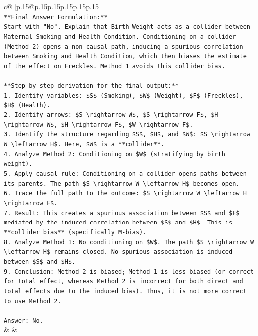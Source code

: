 \documentclass{article}
\begin{document}
{\begin{supertabular}{c@{$\;$}|p{.15\linewidth}@{}p{.15\linewidth}p{.15\linewidth}p{.15\linewidth}p{.15\linewidth}p{.15\linewidth}}
{{{\\ 
\texttt{**Final Answer Formulation:**} \\
\texttt{Start with "No". Explain that Birth Weight acts as a collider between Maternal Smoking and Health Condition. Conditioning on a collider (Method 2) opens a non{-}causal path, inducing a spurious correlation between Smoking and Health Condition, which then biases the estimate of the effect on Freckles. Method 1 avoids this collider bias.} \\
\\ 
\texttt{**Step{-}by{-}step derivation for the final output:**} \\
\texttt{1.  Identify variables: \$S\$ (Smoking), \$W\$ (Weight), \$F\$ (Freckles), \$H\$ (Health).} \\
\texttt{2.  Identify arrows: \$S \textbackslash{}rightarrow W\$, \$S \textbackslash{}rightarrow F\$, \$H \textbackslash{}rightarrow W\$, \$H \textbackslash{}rightarrow F\$, \$W \textbackslash{}rightarrow F\$.} \\
\texttt{3.  Identify the structure regarding \$S\$, \$H\$, and \$W\$: \$S \textbackslash{}rightarrow W \textbackslash{}leftarrow H\$. Here, \$W\$ is a **collider**.} \\
\texttt{4.  Analyze Method 2: Conditioning on \$W\$ (stratifying by birth weight).} \\
\texttt{5.  Apply causal rule: Conditioning on a collider opens paths between its parents. The path \$S \textbackslash{}rightarrow W \textbackslash{}leftarrow H\$ becomes open.} \\
\texttt{6.  Trace the full path to the outcome: \$S \textbackslash{}rightarrow W \textbackslash{}leftarrow H \textbackslash{}rightarrow F\$.} \\
\texttt{7.  Result: This creates a spurious association between \$S\$ and \$F\$ mediated by the induced correlation between \$S\$ and \$H\$. This is **collider bias** (specifically M{-}bias).} \\
\texttt{8.  Analyze Method 1: No conditioning on \$W\$. The path \$S \textbackslash{}rightarrow W \textbackslash{}leftarrow H\$ remains closed. No spurious association is induced between \$S\$ and \$H\$.} \\
\texttt{9.  Conclusion: Method 2 is biased; Method 1 is less biased (or correct for total effect, whereas Method 2 is incorrect for both direct and total effects due to the induced bias). Thus, it is not more correct to use Method 2.} \\
\\ 
\texttt{Answer: No.} \\
            }
        }
    }
    & & \\ \\


\end{supertabular}}
\end{document}
